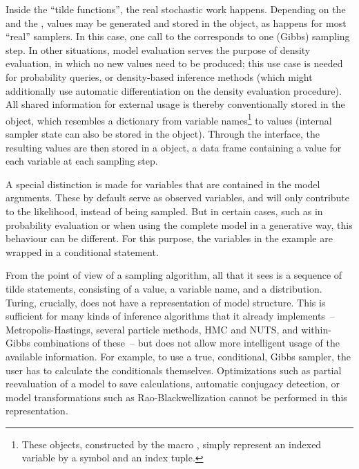 Inside the \enquote{tilde functions}, the real stochastic work happens.
Depending on the  and the , values may be generated and stored in the
 object, as happens for most \enquote{real} samplers.  In this case, one call to the
 corresponds to one (Gibbs) sampling step.  In other situations, model evaluation
serves the purpose of density evaluation, in which no new values need to be produced; this use case
is needed for probability queries, or density-based inference methods (which might additionally use
automatic differentiation on the density evaluation procedure).  All shared information for external
usage is thereby conventionally stored in the  object, which resembles a dictionary
from variable names\footnote{These  objects, constructed by the macro
  , simply represent an indexed variable by a symbol and an index tuple.} to
values (internal sampler state can also be stored in the  object).  Through the
 interface, the resulting values are then stored in a  object, a data
frame containing a value for each variable at each sampling step.

A special distinction is made for variables that are contained in the model arguments.  These by
default serve as observed variables, and will only contribute to the likelihood, instead of being
sampled.  But in certain cases, such as in probability evaluation or when using the complete model
in a generative way, this behaviour can be different.  For this purpose, the variables 
in the example are wrapped in a conditional statement.

From the point of view of a sampling algorithm, all that it sees is a sequence of tilde statements,
consisting of a value, a variable name, and a distribution.  Turing, crucially, does not have a
representation of model structure.  This is sufficient for many kinds of inference algorithms that
it already implements~-- Metropolis-Hastings, several particle methods, HMC and NUTS, and
within-Gibbs combinations of these~-- but does not allow more intelligent usage of the available
information.  For example, to use a true, conditional, Gibbs sampler, the user has to calculate the
conditionals themselves.  Optimizations such as partial reevaluation of a model to save
calculations, automatic conjugacy detection, or model transformations such as Rao-Blackwellization
cannot be performed in this representation.


